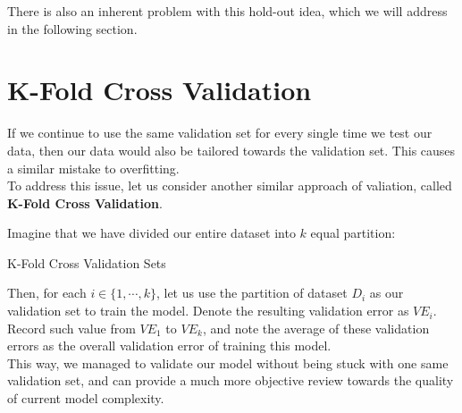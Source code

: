 There is also an inherent problem with this hold-out idea, which we will address in the following section.

\section{K-Fold Cross Validation}
If we continue to use the same validation set for every single time we test our data, then our data would also be tailored towards the validation set. This causes a similar mistake to overfitting. \\
To address this issue, let us consider another similar approach of valiation, called \textbf{K-Fold Cross Validation}.

Imagine that we have divided our entire dataset into $k$ equal partition:
\begin{ln-fig}{K-Fold Cross Validation Sets}{}
    \begin{center}
    \end{center}
\end{ln-fig}
Then, for each $i \in \{1, \cdots, k\}$, let us use the partition of dataset $D_i$ as our validation set to train the model. Denote the resulting validation error as ${VE}_i$. \\
Record such value from ${VE}_1$ to ${VE}_k$, and note the average of these validation errors as the overall validation error of training this model. \\
This way, we managed to validate our model without being stuck with one same validation set, and can provide a much more objective review towards the quality of current model complexity.

